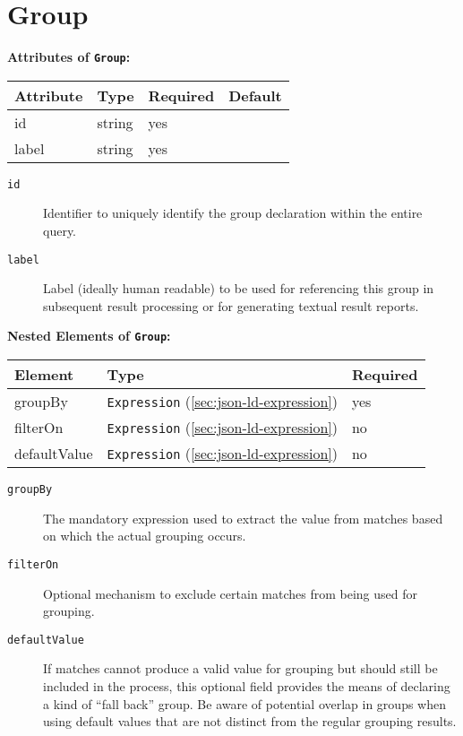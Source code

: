 \documentclass[11pt,a4paper]{report}
\newcommand{\iqlType}[1]{\texttt{\iqlns#1}}
\newenvironment{attributes}[1]{
	\noindent\textbf{Attributes of #1:}\newline\medskip
	\begin{tabular}{|p{0.3\textwidth}|p{0.20\textwidth}|p{0.20\textwidth}|p{0.17\textwidth}|}
		\hline
		\textbf{Attribute} & \textbf{Type} & \textbf{Required} & \textbf{Default} \\ 
		\hline
		\hline
	}{
	\end{tabular}
}
\newcommand{\attribute}[4]{
	#1 & #2 & #3 & #4 \\
	\hline
}
\newenvironment{elements}[1]{
	\noindent\textbf{Nested Elements of #1:}\newline\medskip
	\begin{tabular}{|p{0.3\textwidth}|p{0.42\textwidth}|p{0.17\textwidth}|}
		\hline
		\textbf{Element} & \textbf{Type} & \textbf{Required} \\ 
		\hline
		\hline
	}{
	\end{tabular}
}
\newcommand{\element}[3]{
	#1 & #2 & #3 \\
	\hline
}
\begin{document}
\section{Group}
\label{sec:json-ld-group}
\begin{attributes}{\iqlType{Group}}
	\attribute{id}{string}{yes}{}
	\attribute{label}{string}{yes}{}
\end{attributes}
\begin{description}
	\item[\iqlType{id}] Identifier to uniquely identify the group declaration within the entire query.
	\item[\iqlType{label}] Label (ideally human readable) to be used for referencing this group in subsequent result processing or for generating textual result reports.
\end{description}
\begin{elements}{\iqlType{Group}}
	\element{groupBy}{\iqlType{Expression} (\ref{sec:json-ld-expression})}{yes}
	\element{filterOn}{\iqlType{Expression} (\ref{sec:json-ld-expression})}{no}
	\element{defaultValue}{\iqlType{Expression} (\ref{sec:json-ld-expression})}{no}
\end{elements}
\begin{description}
	\item[\iqlType{groupBy}] The mandatory expression used to extract the value from matches based on which the actual grouping occurs.
	\item[\iqlType{filterOn}] Optional mechanism to exclude certain matches from being used for grouping.
	\item[\iqlType{defaultValue}] If matches cannot produce a valid value for grouping but should still be included in the process, this optional field provides the means of declaring a kind of ``fall back'' group. Be aware of potential overlap in groups when using default values that are not distinct from the regular grouping results.
\end{description}
\end{document}

